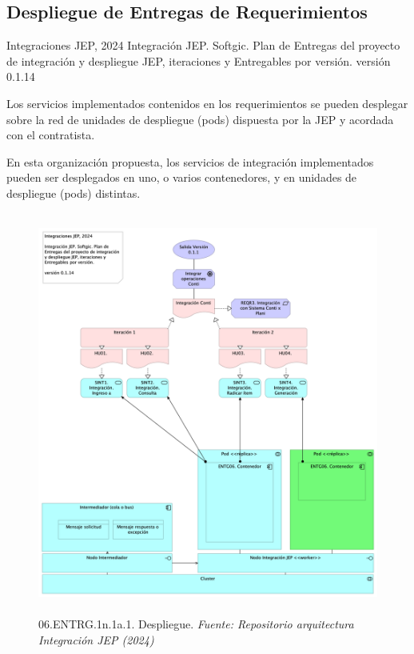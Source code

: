 \documentclass[
  paper=a4,
  ,captions=tableheading
]{scrartcl}
\renewenvironment{quote}{\begin{customblockquote}\list{}{\rightmargin=0em\leftmargin=0em}%
\item\relax\color{blockquote-text}\ignorespaces}{\unskip\unskip\endlist\end{customblockquote}}
\begin{document}
\subsection{Despliegue de Entregas de
Requerimientos}\label{sec:despliegue-de-entregas-de-requerimientos}

\begin{quote}
Integraciones JEP, 2024 Integración JEP. Softgic. Plan de Entregas del
proyecto de integración y despliegue JEP, iteraciones y Entregables por
versión. versión 0.1.14
\end{quote}

Los servicios implementados contenidos en los requerimientos se pueden
desplegar sobre la red de unidades de despliegue (pods) dispuesta por la
JEP y acordada con el contratista.

En esta organización propuesta, los servicios de integración
implementados pueden ser desplegados en uno, o varios contenedores, y en
unidades de despliegue (pods) distintas.

\begin{figure}
\centering
\includegraphics[width=\textwidth,height=5.20833in]{images/06.ENTRG.1n.1a.1.Despliegue.png}
\caption{06.ENTRG.1n.1a.1. Despliegue. \emph{Fuente: Repositorio
arquitectura Integración JEP
(2024)}}\label{fig:id-203e737545e449e59334b47d3034d956}
\end{figure}
\end{document}
